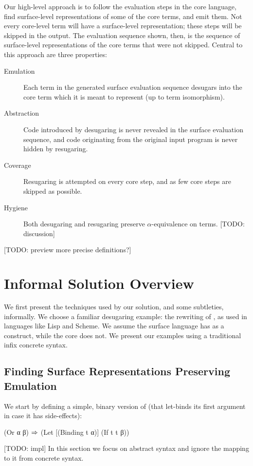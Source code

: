 Our high-level approach is to follow the evaluation steps in the core
language, find surface-level representations of some of the core
terms, and emit them. Not every core-level term will have a
surface-level representation; these steps will be skipped in the
output. The evaluation sequence shown, then, is the sequence of
surface-level representations of the core terms that were not
skipped. Central to this approach are three properties:

\begin{description}
\item[Emulation] Each term in the generated surface evaluation
  sequence desugars into the core term which it is meant to represent
  (up to term isomorphism).
\item[Abstraction] Code introduced by desugaring is never revealed in the
  surface evaluation sequence, and code originating from the original
  input program is never hidden by resugaring.
\item[Coverage] Resugaring is attempted on every core step, and as few
  core steps are skipped as possible.
\item[Hygiene] Both desugaring and resugaring preserve
  $\alpha$-equivalence on terms. [TODO: discussion]
\end{description}
[TODO: preview more precise definitions?]

\section{Informal Solution Overview}
\label{sec:reval-exposition}

We first present the techniques used by our solution, and some subtleties,
informally. We choose a familiar desugaring example: the rewriting
of , as used in languages like Lisp and Scheme. We assume
the surface language has  as a construct, while the core does
not. We present our examples using a traditional infix concrete syntax.

\subsection{Finding Surface Representations Preserving Emulation}

We start by defining a simple, binary version of  (that
let-binds its first argument in case it has side-effects):
\begin{Codes}
(Or α β) \(\Rightarrow\) (Let [(Binding t α)]
                 (If t t β))
\end{Codes}[TODO: impl]
In this section we focus on abstract syntax and ignore
the mapping to it from concrete syntax.

